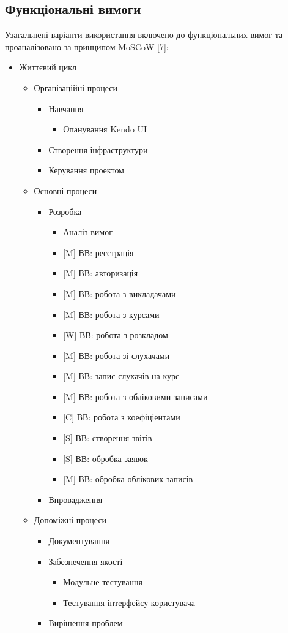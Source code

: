 \bigbreak
\subsection{Функціональні вимоги}
\bigbreak
Узагальнені варіанти використання включено до функціональних вимог та проаналізовано за принципом MoSCoW [7]:
\begin{itemize}
 \item Життєвий цикл
 \begin{itemize}
  \item Організаційні процеси
  \begin{itemize}
   \item Навчання
   \begin{itemize}
    \item Опанування Kendo UI
   \end{itemize}
   \item Створення інфраструктури
   \item Керування проектом
  \end{itemize}
  \item Основні процеси
  \begin{itemize}
   \item Розробка
   \begin{itemize}
    \item Аналіз вимог
    \item {[}M{]} ВВ: реєстрація
    \item {[}M{]} ВВ: авторизація
    \item {[}M{]} ВВ: робота з викладачами
    \item {[}M{]} ВВ: робота з курсами
    \item {[}W{]} ВВ: робота з розкладом
    \item {[}M{]} ВВ: робота зі слухачами
    \item {[}M{]} ВВ: запис слухачів на курс
    \item {[}M{]} ВВ: робота з обліковими записами
    \item {[}C{]} ВВ: робота з коефіціентами
    \item {[}S{]} ВВ: створення звітів
    \item {[}S{]} ВВ: обробка заявок
    \item {[}M{]} ВВ: обробка облікових записів
   \end{itemize}
   \item Впровадження
  \end{itemize}
  \item Допоміжні процеси
  \begin{itemize}
   \item Документування
   \item Забезпечення якості
   \begin{itemize}
    \item Модульне тестування
    \item Тестування інтерфейсу користувача
   \end{itemize}
   \item Вирішення проблем
  \end{itemize}
 \end{itemize}
\end{itemize}
\newpage
